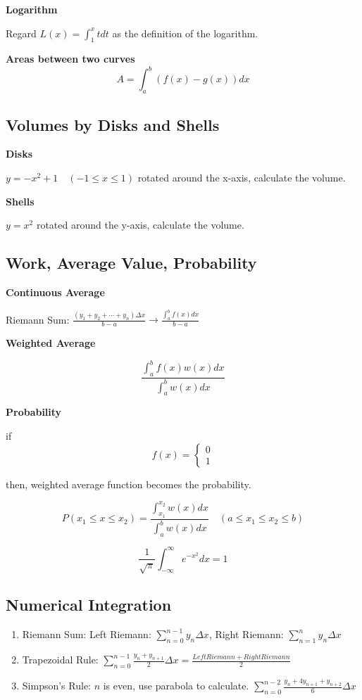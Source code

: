 \documentclass{article}
\newcommand\defint[3]{\int_{#1}^{#2}#3dx}
\newcommand\upperxdefint[2]{\int_{#1}^x{#2}dt}
\begin{document}
\textbf{Logarithm}

Regard $L(x) = \upperxdefint{1}{t}$ as the definition of the logarithm.

\textbf{Areas between two curves}
$$A = \defint{a}{b}{(f(x) - g(x))}$$

\subsection{Volumes by Disks and Shells}

\textbf{Disks}

$y = -x^2+1 \quad (-1 \leq x \leq 1)$ rotated around the x-axis, calculate the volume.

\textbf{Shells}

$y = x^2$ rotated around the y-axis, calculate the volume.

\subsection{Work, Average Value, Probability}

\textbf{Continuous Average}

Riemann Sum: $\frac{(y_1+y_2+\cdots+y_n)\Delta x}{b-a} \rightarrow \frac{\defint{a}{b}{f(x)}}{b-a}$

\textbf{Weighted Average}

$$\frac{\defint{a}{b}{f(x)w(x)}}{\defint{a}{b}{w(x)}}$$

\textbf{Probability}

if
$$
f(x)=
\begin{cases}
0 \\
1
\end{cases}
$$

then, weighted average function becomes the probability.

$$P(x_1 \leq x \leq x_2) = \frac{\defint{x_1}{x_2}{w(x)}}{\defint{a}{b}{w(x)}} \quad (a \leq x_1 \leq x_2 \leq b)$$

$$\frac{1}{\sqrt{\pi}}\defint{-\infty}{\infty}{e^{-x^2}} = 1$$

\subsection{Numerical Integration}
\begin{enumerate}
  \item Riemann Sum: Left Riemann: $\sum\limits_{n=0}^{n-1}y_n\Delta x$, Right Riemann: $\sum\limits_{n=1}^{n}y_n\Delta x$
  \item Trapezoidal Rule: $\sum\limits_{n=0}^{n-1}\frac{y_n+y_{n+1}}{2}\Delta x = \frac{Left Riemann+ Right Riemann}{2}$
  \item Simpson’s Rule: $n$ is even, use parabola to calculate. $\sum\limits_{n=0}^{n-2}\frac{y_n+4y_{n+1}+y_{n+2}}{6}\Delta x$
\end{enumerate}
\end{document}
